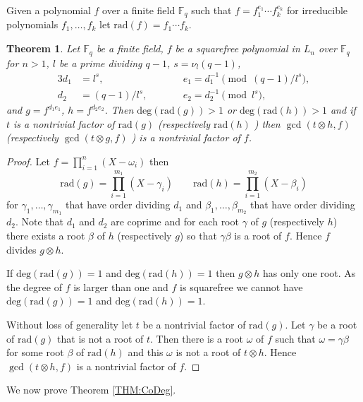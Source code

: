 \documentclass{article}
\newcounter{dummy} \numberwithin{dummy}{section}
\theoremstyle{plain}
\newtheorem{thm}[dummy]{Theorem}
\theoremstyle{definition}
\def\Fq {{ \mathbb{F} _ {q} }}
\def\deg {{ \mathrm{deg}}}
\def\rad {{ \mathrm{rad}}}
\begin{document}
		Given a polynomial $f$ over a finite field $\Fq$ such that $f=f_1^{e_1} \cdots f_k^{e_k}$ for irreducible polynomials $f_1,\ldots,f_k$ let $\rad(f)=f_1 \cdots f_k$.
		
		\begin{thm}
		\label{LEM:coOrd}
		    Let $\Fq$ be a finite field, $f$ be a squarefree polynomial in $L_n$ over $\Fq$ for $n>1$, $l$ be a prime dividing $q-1$, $s=\nu_l(q-1)$, 
				\begin{alignat*}{3}
				    d_1 &=l^s,      \quad\quad && e_1=d_1^{-1} \pmod {(q-1)/l^s}, \\ 
				    d_2 &=(q-1)/l^s, \quad\quad && e_2=d_2^{-1} \pmod {l^s}, 
				\end{alignat*}
				\noindent and $g=f^{d_1e_1}$, $h=f^{d_2e_2}$. Then $\deg(\rad(g))>1$ or $\deg(\rad(h))>1$ and if $t$ is a nontrivial factor of $\rad(g)$ \textup{(}respectively $\rad(h)$ \textup{)} then $\gcd(t \otimes h,f)$ \textup{(}respectively $\gcd(t \otimes g,f)$ \textup{)} is a nontrivial factor of $f$. 
		\end{thm}	
		
		\begin{proof}		
		    Let $f=\prod_{i=1}^n{(X-\omega_i)}$ then 
		        \[ \rad(g)=\prod_{i=1}^{m_1}{(X-\gamma_i)} \quad\quad \rad(h)=\prod_{i=1}^{m_2}{(X-\beta_i)} \]
		    for $\gamma_1,\ldots,\gamma_{m_1}$ that have order dividing $d_1$ and $\beta_1,\ldots,\beta_{m_2}$ that have order dividing $d_2$. Note that $d_1$ and $d_2$ are coprime and for each root $\gamma$ of $g$ (respectively $h$) there exists a root $\beta$ of $h$ (respectively $g$) so that $\gamma\beta$ is a root of $f$. Hence $f$ divides $g \otimes h$. 		   
				
				If $\deg(\rad(g))=1$ and $\deg(\rad(h))=1$ then $g \otimes h$ has only one root. As the degree of $f$ is larger than one and $f$ is squarefree we cannot have $\deg(\rad(g))=1$ and $\deg(\rad(h))=1$.
		
		    Without loss of generality let $t$ be a nontrivial factor of $\rad(g)$. Let $\gamma$ be a root of $\rad(g)$ that is not a root of $t$. Then there is a root $\omega$ of $f$ such that $\omega=\gamma\beta$ for some root $\beta$ of $\rad(h)$ and this $\omega$ is not a root of $t \otimes h$. Hence $\gcd(t \otimes h,f)$ is a nontrivial factor of $f$.
		\end{proof}
		
		We now prove Theorem \ref{THM:CoDeg}.
		
\end{document}
